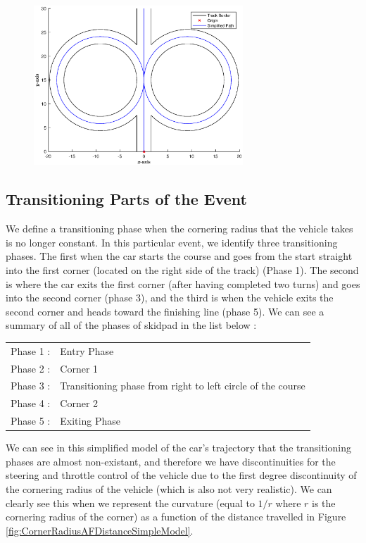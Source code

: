 \documentclass[a4paper, 11pt]{article}
\begin{document}
\begin{figure}[H]
	\centering
	\includegraphics[trim = 1.5cm 0.8cm 1.5cm 1cm, clip, width = 0.7\textwidth]{Figures/SimpleTrajectory}
	\caption{ }
	\label{fig:SimpleTrajectory}
\end{figure}

\subsection{Transitioning Parts of the Event}

We define a transitioning phase when the cornering radius that the vehicle takes is no longer constant. In this particular event, we identify three transitioning phases. The first when the car starts the course and goes from the start straight into the first corner (located on the right side of the track) (Phase 1). The second is where the car exits the first corner (after having completed two turns) and goes into the second corner (phase 3), and the third is when the vehicle exits the second corner and heads toward the finishing line (phase 5). We can see a summary of all of the phases of skidpad in the list below :

\begin{table}[H]
	\centering
	\begin{tabular}{l l}
		Phase 1 : & Entry Phase\\
		Phase 2 : & Corner 1\\
		Phase 3 : & Transitioning phase from right to left circle of the course\\
		Phase 4 : & Corner 2\\
		Phase 5 : & Exiting Phase
	\end{tabular}
\end{table}

 We can see in this simplified model of the car's trajectory that the transitioning phases are almost non-existant, and therefore we have discontinuities for the steering and throttle control of the vehicle due to the first degree discontinuity of the cornering radius of the vehicle (which is also not very realistic). We can clearly see this when we represent the curvature (equal to $1/r$ where $r$ is the cornering radius of the corner) as a function of the distance travelled in Figure \ref{fig:CornerRadiusAFDistanceSimpleModel}.
\end{document}
